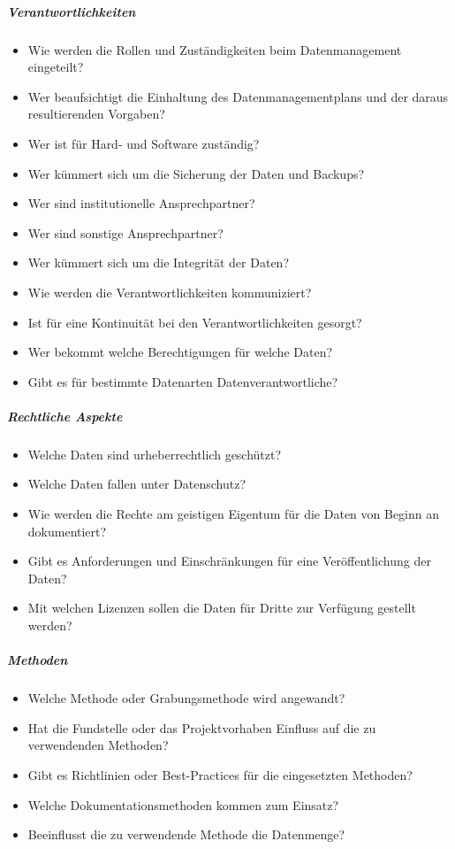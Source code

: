\subparagraph{Verantwortlichkeiten}
\begin{itemize}
    \item Wie werden die Rollen und Zuständigkeiten beim Datenmanagement eingeteilt?
    \item Wer beaufsichtigt die Einhaltung des Datenmanagementplans und der daraus resultierenden Vorgaben?
    \item Wer ist für Hard- und Software zuständig?
    \item Wer kümmert sich um die Sicherung der Daten und Backups?
    \item Wer sind institutionelle Ansprechpartner?
    \item Wer sind sonstige Ansprechpartner?
    \item Wer kümmert sich um die Integrität der Daten?
    \item Wie werden die Verantwortlichkeiten kommuniziert?
    \item Ist für eine Kontinuität bei den Verantwortlichkeiten gesorgt?
    \item Wer bekommt welche Berechtigungen für welche Daten?
    \item Gibt es für bestimmte Datenarten Datenverantwortliche?
\end{itemize}

\subparagraph{Rechtliche Aspekte}
\begin{itemize}
    \item Welche Daten sind urheberrechtlich geschützt?
    \item Welche Daten fallen unter Datenschutz?
    \item Wie werden die Rechte am geistigen Eigentum für die Daten von Beginn an dokumentiert?
    \item Gibt es Anforderungen und Einschränkungen für eine Veröffentlichung der Daten?
    \item Mit welchen Lizenzen sollen die Daten für Dritte zur Verfügung gestellt werden?
\end{itemize}

\subparagraph{Methoden}
\begin{itemize}
    \item Welche Methode oder Grabungsmethode wird angewandt?
    \item Hat die Fundstelle oder das Projektvorhaben Einfluss auf die zu verwendenden Methoden?
    \item Gibt es Richtlinien oder Best-Practices für die eingesetzten Methoden?
    \item Welche Dokumentationsmethoden kommen zum Einsatz?
    \item Beeinflusst die zu verwendende Methode die Datenmenge?
\end{itemize}

